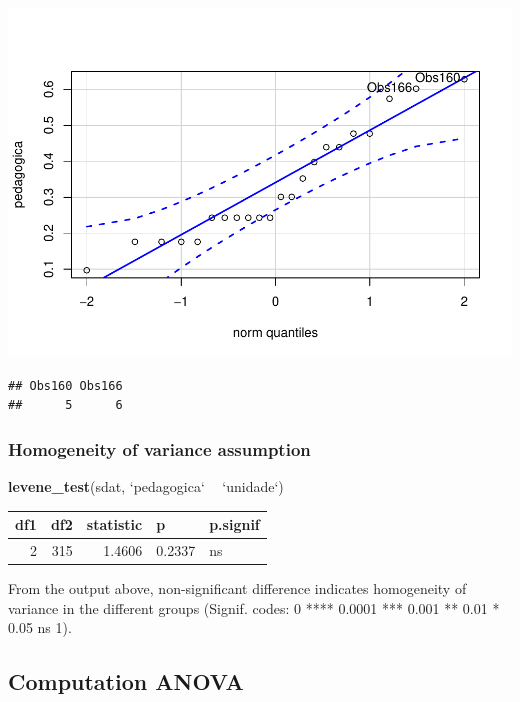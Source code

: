 \documentclass[]{article}
\newenvironment{Shaded}{\begin{snugshade}}{\end{snugshade}}
\newcommand{\DataTypeTok}[1]{\textcolor[rgb]{0.13,0.29,0.53}{#1}}
\newcommand{\KeywordTok}[1]{\textcolor[rgb]{0.13,0.29,0.53}{\textbf{#1}}}
\newcommand{\NormalTok}[1]{#1}
\newcommand{\OperatorTok}[1]{\textcolor[rgb]{0.81,0.36,0.00}{\textbf{#1}}}
\newcommand{\StringTok}[1]{\textcolor[rgb]{0.31,0.60,0.02}{#1}}
\begin{document}
\includegraphics{factorialAnova_files/figure-latex/unnamed-chunk-22-1.pdf}

\begin{verbatim}
## Obs160 Obs166 
##      5      6
\end{verbatim}

\hypertarget{homogeneity-of-variance-assumption}{%
\subsubsection{Homogeneity of variance
assumption}\label{homogeneity-of-variance-assumption}}

\begin{Shaded}
\begin{Highlighting}[]
\KeywordTok{levene_test}\NormalTok{(sdat, }\StringTok{`}\DataTypeTok{pedagogica}\StringTok{`} \OperatorTok{~}\StringTok{ `}\DataTypeTok{unidade}\StringTok{`}\NormalTok{)}
\end{Highlighting}
\end{Shaded}

\begin{longtable}[]{@{}rrrll@{}}
\toprule
df1 & df2 & statistic & p & p.signif\tabularnewline
\midrule
\endhead
2 & 315 & 1.4606 & 0.2337 & ns\tabularnewline
\bottomrule
\end{longtable}

From the output above, non-significant difference indicates homogeneity
of variance in the different groups (Signif. codes: 0 **** 0.0001 ***
0.001 ** 0.01 * 0.05 ns 1).

\hypertarget{computation-anova}{%
\subsection{Computation ANOVA}\label{computation-anova}}
\end{document}
